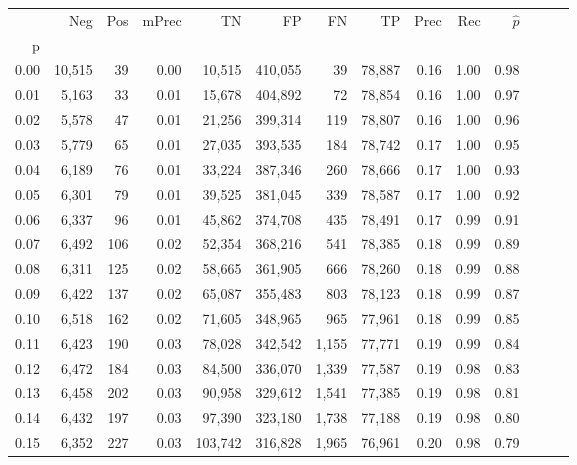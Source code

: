 \begin{tabular}{rrrrrrrrrrrrrr}
\toprule
{} &     Neg &    Pos & mPrec &       TN &       FP &      FN &      TP &  Prec &   Rec & $\hat{p}$ \\
p    &         &        &       &          &          &         &         &       &       &           \\
\midrule
0.00 &  10,515 &     39 &  0.00 &   10,515 &  410,055 &      39 &  78,887 &  0.16 &  1.00 &      0.98 \\
0.01 &   5,163 &     33 &  0.01 &   15,678 &  404,892 &      72 &  78,854 &  0.16 &  1.00 &      0.97 \\
0.02 &   5,578 &     47 &  0.01 &   21,256 &  399,314 &     119 &  78,807 &  0.16 &  1.00 &      0.96 \\
0.03 &   5,779 &     65 &  0.01 &   27,035 &  393,535 &     184 &  78,742 &  0.17 &  1.00 &      0.95 \\
0.04 &   6,189 &     76 &  0.01 &   33,224 &  387,346 &     260 &  78,666 &  0.17 &  1.00 &      0.93 \\
0.05 &   6,301 &     79 &  0.01 &   39,525 &  381,045 &     339 &  78,587 &  0.17 &  1.00 &      0.92 \\
0.06 &   6,337 &     96 &  0.01 &   45,862 &  374,708 &     435 &  78,491 &  0.17 &  0.99 &      0.91 \\
0.07 &   6,492 &    106 &  0.02 &   52,354 &  368,216 &     541 &  78,385 &  0.18 &  0.99 &      0.89 \\
0.08 &   6,311 &    125 &  0.02 &   58,665 &  361,905 &     666 &  78,260 &  0.18 &  0.99 &      0.88 \\
0.09 &   6,422 &    137 &  0.02 &   65,087 &  355,483 &     803 &  78,123 &  0.18 &  0.99 &      0.87 \\
0.10 &   6,518 &    162 &  0.02 &   71,605 &  348,965 &     965 &  77,961 &  0.18 &  0.99 &      0.85 \\
0.11 &   6,423 &    190 &  0.03 &   78,028 &  342,542 &   1,155 &  77,771 &  0.19 &  0.99 &      0.84 \\
0.12 &   6,472 &    184 &  0.03 &   84,500 &  336,070 &   1,339 &  77,587 &  0.19 &  0.98 &      0.83 \\
0.13 &   6,458 &    202 &  0.03 &   90,958 &  329,612 &   1,541 &  77,385 &  0.19 &  0.98 &      0.81 \\
0.14 &   6,432 &    197 &  0.03 &   97,390 &  323,180 &   1,738 &  77,188 &  0.19 &  0.98 &      0.80 \\
0.15 &   6,352 &    227 &  0.03 &  103,742 &  316,828 &   1,965 &  76,961 &  0.20 &  0.98 &      0.79 \\

\end{tabular}
